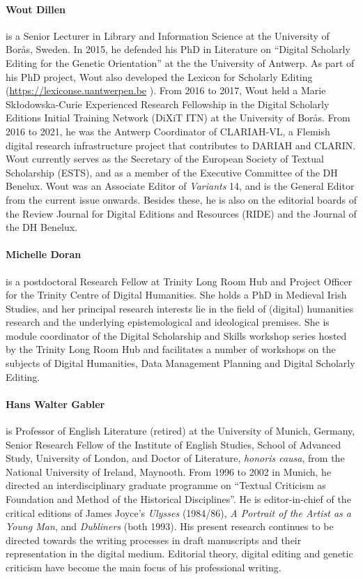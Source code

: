 \paragraph{Wout Dillen} is a Senior Lecturer in Library and Information Science at the University of Borås, Sweden. In 2015, he defended his PhD in Literature on ``Digital Scholarly Editing for the Genetic Orientation'' at the the University of Antwerp. As part of his PhD project, Wout also developed the Lexicon for Scholarly Editing (\url{https://lexiconse.uantwerpen.be}
). From 2016 to 2017, Wout held a Marie Skłodowska-Curie Experienced Research Fellowship in the Digital Scholarly Editions Initial Training Network (DiXiT ITN) at the University of Borås. From 2016 to 2021, he was the Antwerp Coordinator of CLARIAH-VL, a Flemish digital research infrastructure project that contributes to DARIAH and CLARIN. Wout currently serves as the Secretary of the European Society of Textual Scholarship (ESTS), and as a member of the Executive Committee of the DH Benelux. Wout was an Associate Editor of \emph{Variants} 14, and is the General Editor from the current issue onwards. Besides these, he is also on the editorial boards of the Review Journal for Digital Editions and Resources (RIDE) and the Journal of the DH Benelux.

\paragraph{Michelle Doran} is a postdoctoral Research Fellow at Trinity Long Room Hub and Project Officer for the Trinity Centre of Digital Humanities. She holds a PhD in Medieval Irish Studies, and her principal research interests lie in the field of (digital) humanities research and the underlying epistemological and ideological premises. She is module coordinator of the Digital Scholarship and Skills workshop series hosted by the Trinity Long Room Hub and facilitates a number of workshops on the subjects of Digital Humanities, Data Management Planning and Digital Scholarly Editing.

\paragraph{Hans Walter Gabler} is Professor of English Literature (retired) at the
University of Munich, Germany, Senior Research Fellow of the Institute
of English Studies, School of Advanced Study, University of London, and
Doctor of Literature, \emph{honoris causa}, from the National University
of Ireland, Maynooth. From 1996 to 2002 in Munich, he directed an
interdisciplinary graduate programme on ``Textual Criticism as
Foundation and Method of the Historical Disciplines''. He is
editor-in-chief of the critical editions of James Joyce's \emph{Ulysses}
(1984/86), \emph{A Portrait of the Artist as a Young Man}, and
\emph{Dubliners} (both 1993). His present research continues to be
directed towards the writing processes in draft manuscripts and their
representation in the digital medium. Editorial theory, digital editing
and genetic criticism have become the main focus of his professional
writing.

